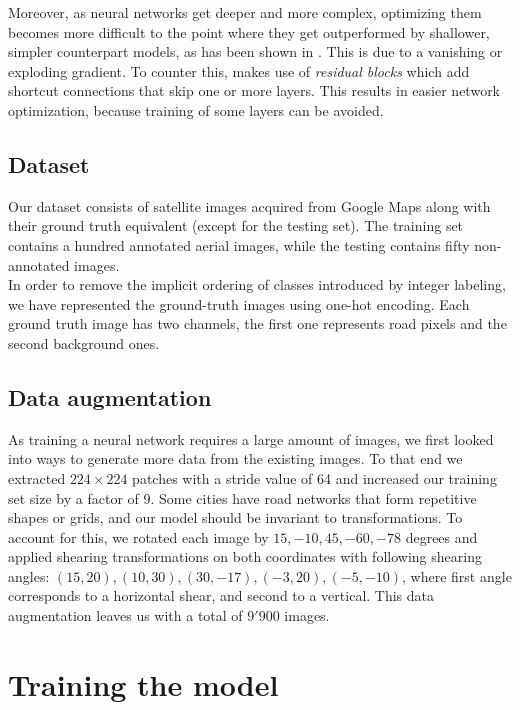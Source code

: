 \documentclass[10pt,conference,compsocconf]{IEEEtran}
\begin{document}
Moreover, as neural networks get deeper and more complex, optimizing them becomes more difficult to the point where they get outperformed by shallower, simpler counterpart models, as has been shown in \cite{deep_residual_nn}. This is due to a vanishing or exploding gradient. To counter this, \cite{deep_residual_nn} makes use of \textit{residual blocks} which add shortcut connections that skip one or more layers. This results in easier network optimization, because training of some layers can be avoided.

\subsection{Dataset}

Our dataset consists of satellite images acquired from Google Maps along with their ground truth equivalent (except for the testing set). The training set contains a hundred annotated aerial images, while the testing contains fifty non-annotated images. \\

In order to remove the implicit ordering of classes introduced by integer labeling, we have represented the ground-truth images using one-hot encoding. Each ground truth image has two channels, the first one represents road pixels and the second background ones.

\subsection{Data augmentation}

As training a neural network requires a large amount of images, we first looked into ways to generate more data from the existing images. To that end we extracted $224 \times 224$ patches with a stride value of 64 and increased our training set size by a factor of 9. Some cities have road networks that form repetitive shapes or grids, and our model should be invariant to transformations. To account for this, we rotated each image by $15, -10, 45, -60, -78$ degrees and applied shearing transformations on both coordinates with following shearing angles: $(15, 20), (10, 30), (30, -17), (-3, 20), (-5, -10)$, where first angle corresponds to a horizontal shear, and second to a vertical. This data augmentation leaves us with a total of $9'900$ images.

\section{Training the model}
\end{document}
